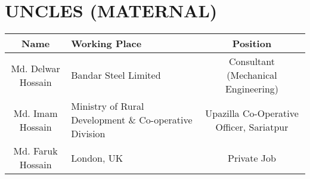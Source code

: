 \documentclass{article}
\begin{document}
\section*{UNCLES (MATERNAL)}
\begin{tabular}{|c|m{5cm}|c|}
    \hline
    \textbf{Name} & \textbf{Working Place} & \textbf{Position} \\
    \hline
    Md. Delwar Hossain & Bandar Steel Limited & Consultant (Mechanical Engineering) \\
    \hline
    Md. Imam Hossain & Ministry of Rural Development \& Co-operative Division & Upazilla Co-Operative Officer, Sariatpur \\
    \hline
    Md. Faruk Hossain & London, UK & Private Job \\
    \hline
\end{tabular}
\end{document}
